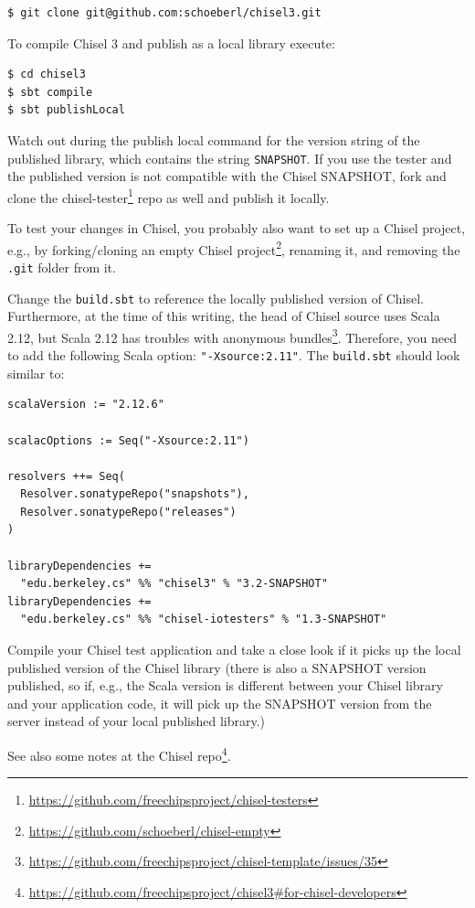 \documentclass[%
    10pt,
    headinclude, footexclude,
    openright, %
    notitlepage,
    cleardoubleempty,
    headsepline,
    pointlessnumbers,
    bibtotoc, idxtotoc,
    ]{scrbook}
\newcommand{\code}[1]{{\small{\texttt{#1}}}}
\newcommand{\myref}[2]{\href{#1}{#2}}
\renewcommand{\myref}[2]{{#2}{\footnote{\url{#1}}}}
\begin{document}
\begin{verbatim}
$ git clone git@github.com:schoeberl/chisel3.git
\end{verbatim}

To compile Chisel 3 and publish as a local library execute:
\begin{verbatim}
$ cd chisel3
$ sbt compile
$ sbt publishLocal
\end{verbatim}

Watch out during the publish local command for the version string of the published
library, which contains the string \code{SNAPSHOT}.
If you use the tester and the published version is not compatible with the Chisel
SNAPSHOT, fork and clone the \myref{https://github.com/freechipsproject/chisel-testers}{chisel-tester}
repo as well and publish it locally.

To test your changes in Chisel, you probably also want to set up a Chisel project,
e.g., by forking/cloning an \myref{https://github.com/schoeberl/chisel-empty}{empty Chisel project},
renaming it, and removing the \code{.git} folder from it.

Change the \code{build.sbt} to reference the locally published version of Chisel.
Furthermore, at the time of this writing, the head of Chisel source uses Scala 2.12, but Scala
2.12 has troubles with
\myref{https://github.com/freechipsproject/chisel-template/issues/35}{anonymous bundles}.
Therefore, you need to add the following Scala option: \code{"-Xsource:2.11"}.
The \code{build.sbt} should look similar to:

\begin{verbatim}
scalaVersion := "2.12.6"

scalacOptions := Seq("-Xsource:2.11")

resolvers ++= Seq(
  Resolver.sonatypeRepo("snapshots"),
  Resolver.sonatypeRepo("releases")
)

libraryDependencies +=
  "edu.berkeley.cs" %% "chisel3" % "3.2-SNAPSHOT"
libraryDependencies +=
  "edu.berkeley.cs" %% "chisel-iotesters" % "1.3-SNAPSHOT"
\end{verbatim}

Compile your Chisel test application and take a close look if it picks up the local published
version of the Chisel library (there is also a SNAPSHOT version published, so if, e.g.,
the Scala version is different between your Chisel library and your application code,
it will pick up the SNAPSHOT version from the server instead of your local published
library.)

See also \myref{https://github.com/freechipsproject/chisel3\#for-chisel-developers}{some notes
at the Chisel repo}.
\end{document}
